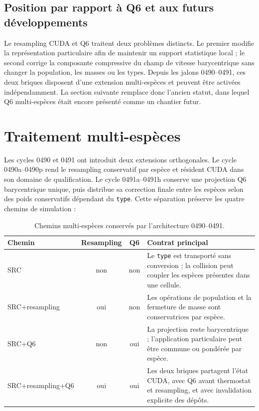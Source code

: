 \documentclass[11pt,a4paper]{article}
\begin{document}
\subsection{Position par rapport à Q6 et aux futurs développements}

Le resampling CUDA et Q6 traitent deux problèmes distincts. Le premier modifie la représentation particulaire afin de maintenir un support statistique local ; le second corrige la composante compressive du champ de vitesse barycentrique sans changer la population, les masses ou les types. Depuis les jalons 0490--0491, ces deux briques disposent d'une extension multi-espèces et peuvent être activées indépendamment. La section suivante remplace donc l'ancien statut, dans lequel Q6 multi-espèces était encore présenté comme un chantier futur.


\section{Traitement multi-espèces}

Les cycles 0490 et 0491 ont introduit deux extensions orthogonales. Le cycle 0490a--0490p rend le resampling conservatif par espèce et résident CUDA dans son domaine de qualification. Le cycle 0491a--0491h conserve une projection Q6 barycentrique unique, puis distribue sa correction finale entre les espèces selon des poids conservatifs dépendant du 
\texttt{type}. Cette séparation préserve les quatre chemins de simulation :

\begin{table}[htbp]
\centering
\small
\caption{Chemins multi-espèces conservés par l'architecture 0490--0491.}
\begin{tabular}{@{}p{}ccp{}@{}}
\toprule
Chemin & Resampling & Q6 & Contrat principal \\
\midrule
SRC & non & non & Le \texttt{type} est transporté sans conversion ; la collision peut coupler les espèces présentes dans une cellule. \\
SRC+resampling & oui & non & Les opérations de population et la fermeture de masse sont conservatrices par espèce. \\
SRC+Q6 & non & oui & La projection reste barycentrique ; l'application particulaire peut être commune ou pondérée par espèce. \\
SRC+resampling+Q6 & oui & oui & Les deux briques partagent l'état CUDA, avec Q6 avant thermostat et resampling, et avec invalidation explicite des dépôts. \\
\bottomrule
\end{tabular}
\end{table}
\end{document}
